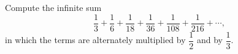 Compute the infinite sum
\[\dfrac13+\dfrac16+\dfrac1{18}+\dfrac1{36}+\dfrac1{108}+\dfrac1{216}+\cdots,\]
in which the terms are alternately multiplied by $\dfrac12$ and by $\dfrac13$.
